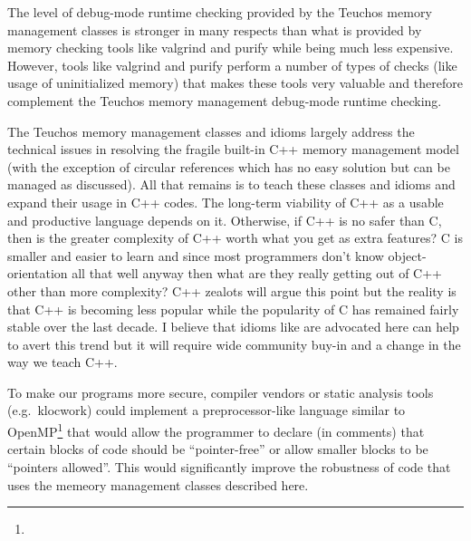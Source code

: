 \documentclass[pdf,ps2pdf,11pt]{SANDreport}
\begin{document}
The level of debug-mode runtime checking provided by the Teuchos
memory management classes is stronger in many respects than what is
provided by memory checking tools like valgrind and purify while being
much less expensive.  However, tools like valgrind and purify perform
a number of types of checks (like usage of uninitialized memory) that
makes these tools very valuable and therefore complement the Teuchos
memory management debug-mode runtime checking.

The Teuchos memory management classes and idioms largely address the
technical issues in resolving the fragile built-in C++ memory
management model (with the exception of circular references which has
no easy solution but can be managed as discussed).  All that remains
is to teach these classes and idioms and expand their usage in C++
codes.  The long-term viability of C++ as a usable and productive
language depends on it.  Otherwise, if C++ is no safer than C, then is
the greater complexity of C++ worth what you get as extra features?  C
is smaller and easier to learn and since most programmers don't know
object-orientation all that well anyway then what are they really
getting out of C++ other than more complexity?  C++ zealots will argue
this point but the reality is that C++ is becoming less popular while
the popularity of C has remained fairly stable over the last decade.
I believe that idioms like are advocated here can help to avert this
trend but it will require wide community buy-in and a change in the
way we teach C++.

To make our programs more secure, compiler vendors or static analysis
tools (e.g.\ klocwork) could implement a preprocessor-like language
similar to OpenMP\footnote{{}} that would allow
the programmer to declare (in comments) that certain blocks of code
should be ``pointer-free'' or allow smaller blocks to be ``pointers
allowed''.  This would significantly improve the robustness of code
that uses the memeory management classes described here.



%

\clearpage
\providecommand*{\phantomsection}{}
\phantomsection
{}



%
\appendix
\end{document}
